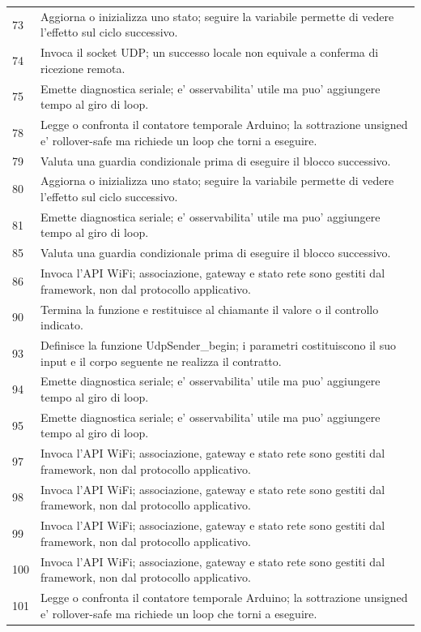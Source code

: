 \documentclass[11pt,a4paper]{article}
\begin{document}
\begin{longtable}{p{}p{}}
73 & Aggiorna o inizializza uno stato; seguire la variabile permette di vedere l'effetto sul ciclo successivo. \\
74 & Invoca il socket UDP; un successo locale non equivale a conferma di ricezione remota. \\
75 & Emette diagnostica seriale; e' osservabilita' utile ma puo' aggiungere tempo al giro di loop. \\
78 & Legge o confronta il contatore temporale Arduino; la sottrazione unsigned e' rollover-safe ma richiede un loop che torni a eseguire. \\
79 & Valuta una guardia condizionale prima di eseguire il blocco successivo. \\
80 & Aggiorna o inizializza uno stato; seguire la variabile permette di vedere l'effetto sul ciclo successivo. \\
81 & Emette diagnostica seriale; e' osservabilita' utile ma puo' aggiungere tempo al giro di loop. \\
85 & Valuta una guardia condizionale prima di eseguire il blocco successivo. \\
86 & Invoca l'API WiFi; associazione, gateway e stato rete sono gestiti dal framework, non dal protocollo applicativo. \\
90 & Termina la funzione e restituisce al chiamante il valore o il controllo indicato. \\
93 & Definisce la funzione UdpSender\_\allowbreak{}begin; i parametri costituiscono il suo input e il corpo seguente ne realizza il contratto. \\
94 & Emette diagnostica seriale; e' osservabilita' utile ma puo' aggiungere tempo al giro di loop. \\
95 & Emette diagnostica seriale; e' osservabilita' utile ma puo' aggiungere tempo al giro di loop. \\
97 & Invoca l'API WiFi; associazione, gateway e stato rete sono gestiti dal framework, non dal protocollo applicativo. \\
98 & Invoca l'API WiFi; associazione, gateway e stato rete sono gestiti dal framework, non dal protocollo applicativo. \\
99 & Invoca l'API WiFi; associazione, gateway e stato rete sono gestiti dal framework, non dal protocollo applicativo. \\
100 & Invoca l'API WiFi; associazione, gateway e stato rete sono gestiti dal framework, non dal protocollo applicativo. \\
101 & Legge o confronta il contatore temporale Arduino; la sottrazione unsigned e' rollover-safe ma richiede un loop che torni a eseguire. \\

\end{longtable}
\end{document}
